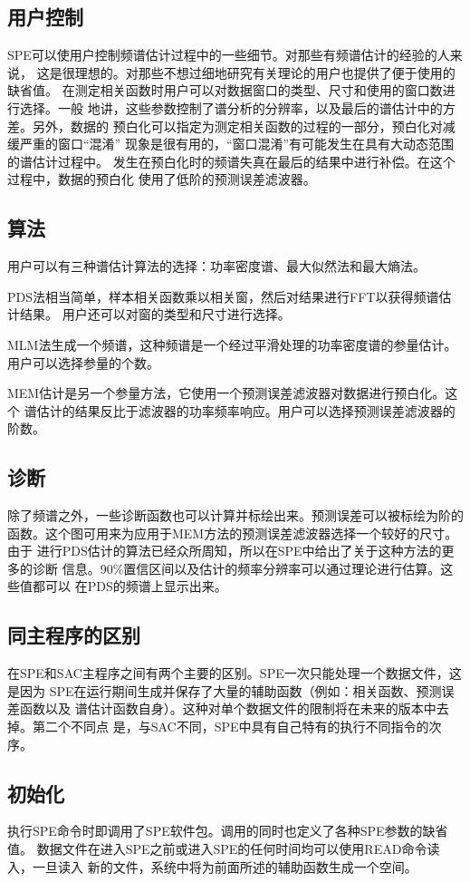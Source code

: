 \subsection{用户控制}
SPE可以使用户控制频谱估计过程中的一些细节。对那些有频谱估计的经验的人来说，
这是很理想的。对那些不想过细地研究有关理论的用户也提供了便于使用的缺省值。
在测定相关函数时用户可以对数据窗口的类型、尺寸和使用的窗口数进行选择。一般
地讲，这些参数控制了谱分析的分辨率，以及最后的谱估计中的方差。另外，数据的
预白化可以指定为测定相关函数的过程的一部分，预白化对减缓严重的窗口``混淆''
现象是很有用的，``窗口混淆''有可能发生在具有大动态范围的谱估计过程中。
发生在预白化时的频谱失真在最后的结果中进行补偿。在这个过程中，数据的预白化
使用了低阶的预测误差滤波器。

\subsection{算法}
用户可以有三种谱估计算法的选择：功率密度谱、最大似然法和最大熵法。

PDS法相当简单，样本相关函数乘以相关窗，然后对结果进行FFT以获得频谱估计结果。
用户还可以对窗的类型和尺寸进行选择。

MLM法生成一个频谱，这种频谱是一个经过平滑处理的功率密度谱的参量估计。
用户可以选择参量的个数。

MEM估计是另一个参量方法，它使用一个预测误差滤波器对数据进行预白化。这个
谱估计的结果反比于滤波器的功率频率响应。用户可以选择预测误差滤波器的阶数。

\subsection{诊断}
除了频谱之外，一些诊断函数也可以计算并标绘出来。预测误差可以被标绘为阶的
函数。这个图可用来为应用于MEM方法的预测误差滤波器选择一个较好的尺寸。由于
进行PDS估计的算法已经众所周知，所以在SPE中给出了关于这种方法的更多的诊断
信息。90\%置信区间以及估计的频率分辨率可以通过理论进行估算。这些值都可以
在PDS的频谱上显示出来。

\subsection{同主程序的区别}
在SPE和SAC主程序之间有两个主要的区别。SPE一次只能处理一个数据文件，这是因为
SPE在运行期间生成并保存了大量的辅助函数（例如：相关函数、预测误差函数以及
谱估计函数自身）。这种对单个数据文件的限制将在未来的版本中去掉。第二个不同点
是，与SAC不同，SPE中具有自己特有的执行不同指令的次序。

\subsection{初始化}
执行SPE命令时即调用了SPE软件包。调用的同时也定义了各种SPE参数的缺省值。
数据文件在进入SPE之前或进入SPE的任何时间均可以使用READ命令读入，一旦读入
新的文件，系统中将为前面所述的辅助函数生成一个空间。

